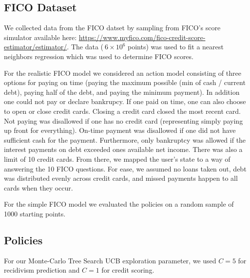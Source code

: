 \documentclass{article}
\begin{document}
\subsection{FICO Dataset}
We collected data from the FICO datset by sampling from FICO's score simulator available here: \url{https://www.myfico.com/fico-credit-score-estimator/estimator/}. The data ($~6\times 10^6$ points) was used to fit a nearest neighbors regression which was used to determine FICO scores.

For the realistic FICO model we considered an action model consisting of three options for paying on time (paying the maximum possible (min of cash / current debt), paying half of the debt, and paying the minimum payment). In addition one could not pay or declare bankrupcy. If one paid on time, one can also choose to open or close credit cards. Closing a credit card closed the most recent card. Not paying was disallowed if one has no credit card (representing simply paying up front for everything). On-time payment was disallowed if one did not have sufficient cash for the payment. Furthermore, only bankruptcy was allowed if the interest payments on debt exceeded ones available net income. There was also a limit of 10 credit cards. From there, we mapped the user's state to a way of answering the 10 FICO questions. For ease, we assumed no loans taken out, debt was distributed evenly across credit cards, and missed payments happen to all cards when they occur.

For the simple FICO model we evaluated the policies on a random sample of 1000 starting points.


\subsection{Policies}
For our Monte-Carlo Tree Search UCB exploration parameter, we used $C=5$ for recidivism prediction and $C=1$ for credit scoring.

\end{document}
